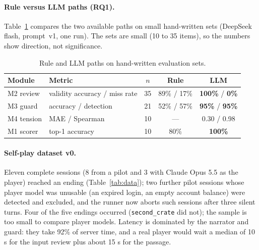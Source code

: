 \documentclass{article}
\begin{document}
\paragraph{Rule versus LLM paths (RQ1).}
Table~\ref{tab:modules} compares the two available paths on small hand-written sets (DeepSeek flash, prompt~v1, one run). The sets are small (10 to 35 items), so the numbers show direction, not significance.

\begin{table}[t]
\centering\small
\caption{Rule and LLM paths on hand-written evaluation sets.}
\label{tab:modules}
\begin{tabular}{llccc}
\toprule
Module & Metric & $n$ & Rule & LLM \\
\midrule
M2 review & validity accuracy / miss rate & 35 & 89\% / 17\% & \textbf{100\%} / \textbf{0\%} \\
M3 guard & accuracy / detection & 21 & 52\% / 57\% & \textbf{95\%} / \textbf{95\%} \\
M4 tension & MAE / Spearman & 10 & --- & 0.30 / 0.98 \\
M1 scorer & top-1 accuracy & 10 & 80\% & \textbf{100\%} \\
\bottomrule
\end{tabular}
\end{table}

\paragraph{Self-play dataset v0.}
Eleven complete sessions (8 from a pilot and 3 with Claude Opus 5.5 as the player) reached an ending (Table~\ref{tab:data}); two further pilot sessions whose player model was unusable (an expired login, an empty account balance) were detected and excluded, and the runner now aborts such sessions after three silent turns. Four of the five endings occurred (\texttt{second\_crate} did not); the sample is too small to compare player models. Latency is dominated by the narrator and guard: they take 92\% of server time, and a real player would wait a median of 10 s for the input review plus about 15 s for the passage.
\end{document}
